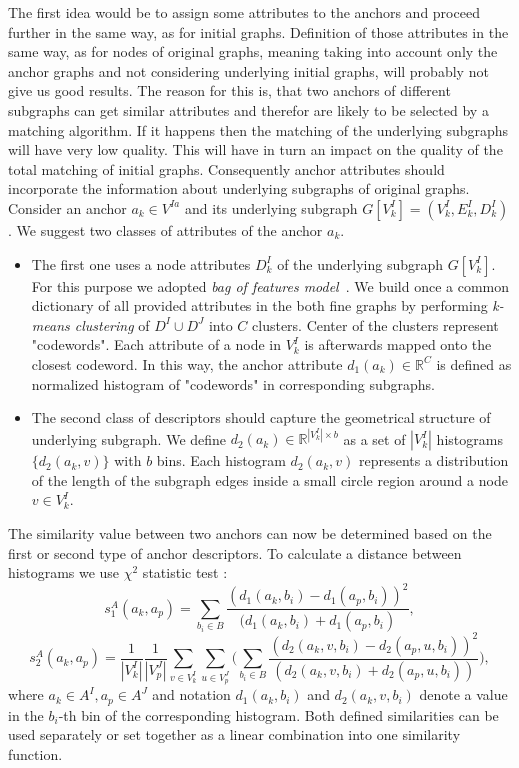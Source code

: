 The first idea would be to assign some attributes to the anchors and proceed further in the same way, as for initial graphs. Definition of those attributes in the same way, as for nodes of original graphs, meaning taking into account only the anchor graphs and not considering underlying initial graphs, will probably not give us good results. The reason for this is, that two anchors of different subgraphs can get similar attributes and therefor are likely to be selected by a matching algorithm. If it happens then the matching of the underlying subgraphs will have very low quality. This will have in turn an impact on the quality of the total matching of initial graphs. Consequently anchor attributes should incorporate the information about underlying subgraphs of original graphs.
Consider an anchor $a_k\in V^{Ia}$ and its underlying subgraph $G[V^I_k]=(V^I_k,E^I_k,D^I_k)$. We suggest two classes of attributes of the anchor $a_k$. 
\begin{itemize}
\item The first one uses a node attributes $D^I_k$ of the underlying subgraph $G[V^I_k]$. For this purpose we adopted \emph{bag of features model}~\cite{BoF_Leung2001}. We build once a common dictionary of all provided attributes in the both fine graphs by performing \emph{k-means clustering} of $D^I\cup D^J$ into $C$ clusters. Center of the clusters represent "codewords". Each attribute of a node in $V^I_k$ is afterwards mapped onto the closest codeword. In this way, the anchor attribute $d_1(a_k)\in\mathbb{R}^C$ is defined as normalized histogram of "codewords" in corresponding subgraphs.

\item The second class of descriptors should capture the geometrical structure of underlying subgraph. We define $d_2(a_k)\in\mathbb{R}^{|V^I_k|\times b}$ as a set of $|V^I_k|$ histograms $\{d_2(a_k,v)\}$ with $b$ bins. Each histogram $d_2(a_k,v)$ represents a distribution of the length of the subgraph edges inside a small circle region around a node $v\in V^I_k$. 
\end{itemize}
The similarity value between two anchors can now be determined based on the first or second type of anchor descriptors. To calculate a distance between histograms we use $\chi^2$ statistic test \cite{Weken2004_ChiSqTest}:
\begin{equation}
s^A_1(a_k, a_p) = \sum_{b_i\in B}\frac{(d_1(a_k,b_i)-d_1(a_p,b_i))^2}{(d_1(a_k,b_i)+d_1(a_p,b_i)},
\end{equation}
\begin{equation}
s^A_2(a_k, a_p) = \frac{1}{|V^I_k|}\frac{1}{|V^J_p|}\sum_{v\in V^I_k}\sum_{u\in V^J_p} \big(\sum_{b_i\in B}\frac{(d_2(a_k,v,b_i)-d_2(a_p,u,b_i))^2}{(d_2(a_k,v,b_i)+d_2(a_p,u,b_i))}\big),
\end{equation}
where $a_k\in A^I, a_p\in A^J$ and notation $d_1(a_k,b_i)$ and $d_2(a_k,v,b_i)$ denote a value in the $b_i$-th bin of the corresponding histogram. 
Both defined similarities can be used separately or set together as a linear combination into one similarity function.

